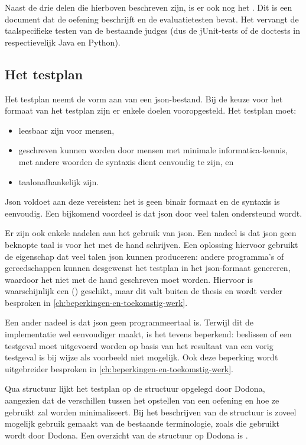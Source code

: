 Naast de drie delen die hierboven beschreven zijn, is er ook nog het .
Dit is een document dat de oefening beschrijft en de evaluatietesten bevat.
Het vervangt de taalspecifieke testen van de bestaande judges (dus de jUnit-tests of de doctests in respectievelijk Java en Python).

\subsection{Het testplan}\label{subsec:het-testplan}

Het testplan neemt de vorm aan van een json-bestand.
Bij de keuze voor het formaat van het testplan zijn er enkele doelen vooropgesteld.
Het testplan moet:

\begin{itemize}
    \item leesbaar zijn voor mensen,
    \item geschreven kunnen worden door mensen met minimale informatica-kennis, met andere woorden de syntaxis dient eenvoudig te zijn, en
    \item taalonafhankelijk zijn.
\end{itemize}

Json voldoet aan deze vereisten: het is geen binair formaat en de syntaxis is eenvoudig.
Een bijkomend voordeel is dat json door veel talen ondersteund wordt.

Er zijn ook enkele nadelen aan het gebruik van json.
Een nadeel is dat json geen beknopte taal is voor het met de hand schrijven.
Een oplossing hiervoor gebruikt de eigenschap dat veel talen json kunnen produceren: andere programma's of gereedschappen kunnen desgewenst het testplan in het json-formaat genereren, waardoor het niet met de hand geschreven moet worden.
Hiervoor is waarschijnlijk een  () geschikt, maar dit valt buiten de thesis en wordt verder besproken in \cref{ch:beperkingen-en-toekomstig-werk}.

Een ander nadeel is dat json geen programmeertaal is.
Terwijl dit de implementatie wel eenvoudiger maakt, is het tevens beperkend: beslissen of een testgeval moet uitgevoerd worden op basis van het resultaat van een vorig testgeval is bij wijze als voorbeeld niet mogelijk.
Ook deze beperking wordt uitgebreider besproken in \cref{ch:beperkingen-en-toekomstig-werk}.

Qua structuur lijkt het testplan op de structuur opgelegd door Dodona, aangezien dat de verschillen tussen het opstellen van een oefening en hoe ze gebruikt zal worden minimaliseert.
Bij het beschrijven van de structuur is zoveel mogelijk gebruik gemaakt van de bestaande terminologie, zoals die gebruikt wordt door Dodona.
Een overzicht van de structuur op Dodona is \autocite{dodona2020}.

